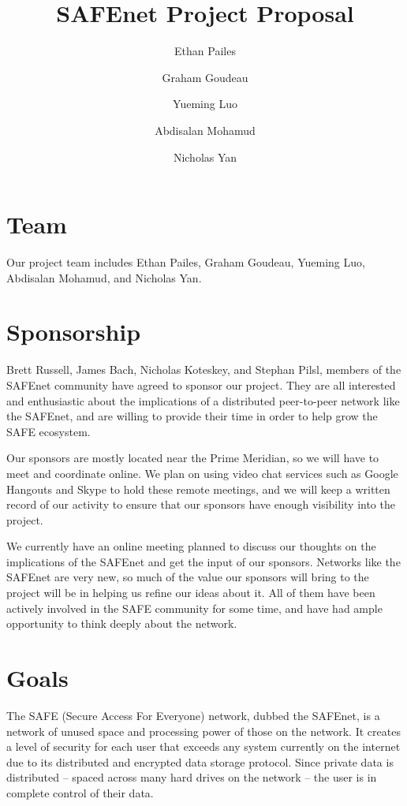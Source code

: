 \documentclass[twocolumn, 12pt]{article}
\title{SAFEnet Project Proposal}
\author{
  Ethan Pailes
  \and
  Graham Goudeau
  \and
  Yueming Luo
  \and
  Abdisalan Mohamud
  \and
  Nicholas Yan
}
\date{}
\begin{document}
\maketitle

\section{Team}
Our project team includes Ethan Pailes, Graham Goudeau, Yueming Luo,
Abdisalan Mohamud, and Nicholas Yan.

\section{Sponsorship}

Brett Russell, James Bach, Nicholas Koteskey, and Stephan Pilsl,
members of the SAFEnet community have agreed to sponsor our project.
They are all interested and enthusiastic about the implications of
a distributed peer-to-peer network like the SAFEnet, and are willing
to provide their time in order to help grow the SAFE ecosystem.

Our sponsors are mostly located near the Prime Meridian, so we will
have to meet and coordinate online. We plan on using video chat services
such as Google Hangouts and Skype to hold these remote meetings, and we
will keep a written record of our activity to ensure that our sponsors
have enough visibility into the project.

We currently have an online meeting planned to discuss our thoughts on
the implications of the SAFEnet and get the input of our sponsors. Networks
like the SAFEnet are very new, so much of the value our sponsors will bring
to the project will be in helping us refine our ideas about it. All of them
have been actively involved in the SAFE community for some time, and have
had ample opportunity to think deeply about the network.

\section{Goals}

The SAFE (Secure Access For Everyone) network, dubbed the SAFEnet,
is a network of unused space and processing power of those on the network.
It creates a level of security for each user that exceeds any system
currently on the internet due to its distributed and encrypted data
storage protocol. Since private data is distributed -- spaced
across many hard drives on the network -- the user is in complete
control of their data.
\end{document}

